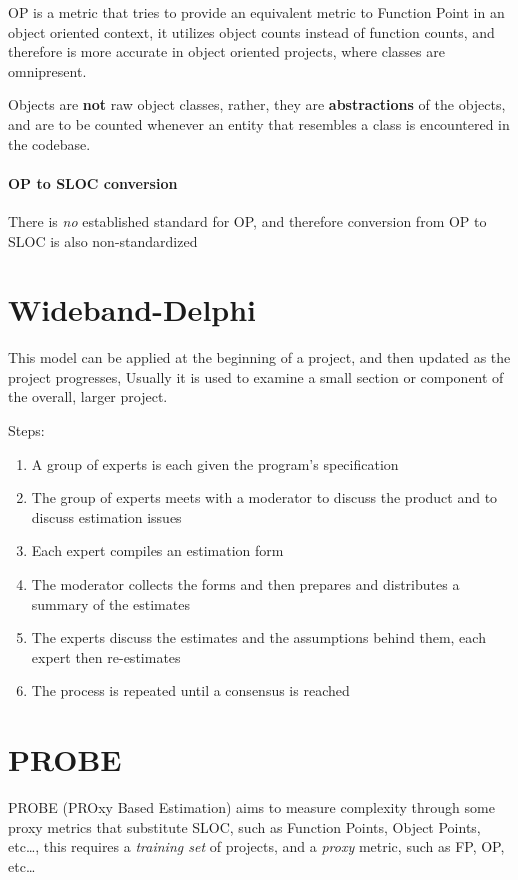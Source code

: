 \documentclass[openright, twoside, twocolumn, a4paper, 10pt]{report}
\begin{document}
OP is a metric that tries to provide an equivalent metric to Function Point in an object oriented context,
it utilizes object counts instead of function counts, and therefore is more accurate in object oriented projects,
where classes are omnipresent.

Objects are \textbf{not} raw object classes, rather, they are \textbf{abstractions} of the objects,
and are to be counted whenever an entity that resembles a class is encountered in the codebase.

\paragraph{OP to SLOC conversion}
There is \emph{no} established standard for OP, and therefore conversion from OP to SLOC is also
non-standardized

\section{Wideband-Delphi}

This model can be applied at the beginning of a project, and then updated as the project progresses,
Usually it is used to examine a small section or component of the overall, larger project.

Steps:

\begin{enumerate}
	\item A group of experts is each given the program's specification
	\item The group of experts meets with a moderator to discuss the product and
	      to discuss estimation issues
	\item Each expert compiles an estimation form
	\item The moderator collects the forms and then prepares and distributes a summary of the estimates
	\item The experts discuss the estimates and the assumptions behind them, each expert then re-estimates
	\item The process is repeated until a consensus is reached
\end{enumerate}

\section{PROBE}
PROBE (PROxy Based Estimation) aims to measure complexity through some proxy metrics
that substitute SLOC, such as Function Points, Object Points, etc\dots, this
requires a \emph{training set} of projects, and a \emph{proxy} metric, such as
FP, OP, etc\dots
\end{document}
